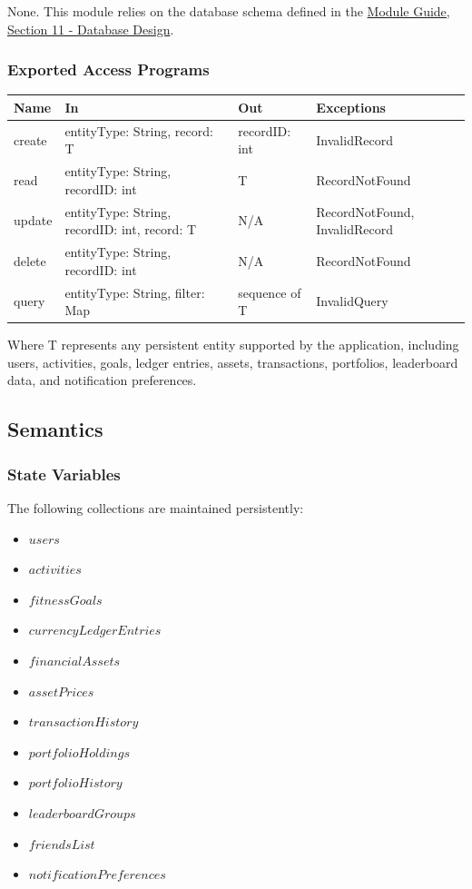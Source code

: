 \documentclass[12pt, titlepage]{article}
\begin{document}
None. This module relies on the database schema defined in the \href{https://github.com/arjunkarthik123/fitness-finance-application/blob/main/pdfs/Design/SoftArchitecture/MG.pdf}{Module Guide, Section 11 - Database Design}.

\subsubsection{Exported Access Programs}

\begin{center}
\begin{tabular}{p{2cm} p{4cm} p{4cm} p{2cm}}
\hline
\textbf{Name} & \textbf{In} & \textbf{Out} & \textbf{Exceptions} \\
\hline
create & entityType: String, record: T & recordID: int & InvalidRecord \\
read & entityType: String, recordID: int & T & RecordNotFound \\
update & entityType: String, recordID: int, record: T & N/A & RecordNotFound, InvalidRecord \\
delete & entityType: String, recordID: int & N/A & RecordNotFound \\
query & entityType: String, filter: Map & sequence of T & InvalidQuery \\
\hline
\end{tabular}
\end{center}

\noindent Where T represents any persistent entity supported by the application, including users, activities, goals, ledger entries, assets, transactions, portfolios, leaderboard data, and notification preferences.

\subsection{Semantics}

\subsubsection{State Variables}

The following collections are maintained persistently:

\begin{itemize}
  \item $\mathit{users}$
  \item $\mathit{activities}$
  \item $\mathit{fitnessGoals}$
  \item $\mathit{currencyLedgerEntries}$
  \item $\mathit{financialAssets}$
  \item $\mathit{assetPrices}$
  \item $\mathit{transactionHistory}$
  \item $\mathit{portfolioHoldings}$
  \item $\mathit{portfolioHistory}$
  \item $\mathit{leaderboardGroups}$
  \item $\mathit{friendsList}$
  \item $\mathit{notificationPreferences}$
\end{itemize}
\end{document}
